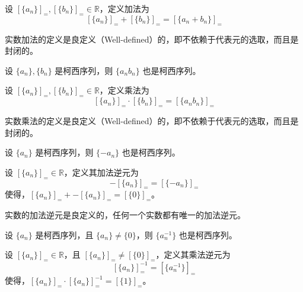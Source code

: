 \begin{definition}
    设 $[\{a_n\}]_{=},[\{b_n\}]_{=}\in\mathbb{R}$，定义加法为
    \[
        [\{a_n\}]_{=} + [\{b_n\}]_{=} = [\{a_n+b_n\}]_{=}
    \]
\end{definition}

\begin{proposition}
    实数加法的定义是良定义（Well-defined）的，即不依赖于代表元的选取，而且是封闭的。
\end{proposition}

\begin{lemma}
    设 $\{a_n\},\{b_n\}$ 是柯西序列，则 $\{a_nb_n\}$ 也是柯西序列。
\end{lemma}

\begin{definition}
    设 $[\{a_n\}]_{=},[\{b_n\}]_{=}\in\mathbb{R}$，定义乘法为
    \[
        [\{a_n\}]_{=} \cdot [\{b_n\}]_{=} = [\{a_nb_n\}]_{=}
    \]
\end{definition}

\begin{proposition}
    实数乘法的定义是良定义（Well-defined）的，即不依赖于代表元的选取，而且是封闭的。
\end{proposition}


\begin{lemma}
    设 $\{a_n\}$ 是柯西序列，则 $\{-a_n\}$ 也是柯西序列。
\end{lemma}


\begin{definition}[实数加法逆元]
    设 $[\{a_n\}]_{=}\in\mathbb{R}$，定义其加法逆元为
    \[
        -[\{a_n\}]_{=} = [\{-a_n\}]_{=}
    \]
    使得，$[\{a_n\}]_{=} + -[\{a_n\}]_{=} = [\{0\}]_{=}$。
\end{definition}

\begin{proposition}
    实数的加法逆元是良定义的，任何一个实数都有唯一的加法逆元。
\end{proposition}

\begin{lemma}
    设 $\{a_n\}$ 是柯西序列，且 $\{a_n\}\neq \{0\}$，则 $\{a_n^{-1}\}$ 也是柯西序列。
\end{lemma}

\begin{definition}[实数乘法逆元]
    设 $[\{a_n\}]_{=}\in\mathbb{R}$，且 $[\{a_n\}]_{=}\neq [\{0\}]_{=}$，定义其乘法逆元为
    \[
        [\{a_n\}]_{=}^{-1} = [\{a_n^{-1}\}]_{=}
    \]
    使得，$[\{a_n\}]_{=} \cdot [\{a_n\}]_{=}^{-1} = [\{1\}]_{=}$。
\end{definition}

